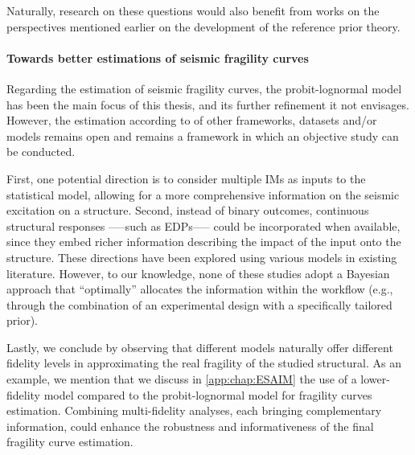 Naturally, research on these questions would also benefit from works on the perspectives mentioned earlier
on the development of the reference prior theory.



\paragraph{Towards better estimations of seismic fragility curves}


Regarding the estimation of seismic fragility curves, the probit-lognormal model has been the main focus of this thesis,
and its further refinement it not envisages.
However, the estimation according to
of other frameworks, datasets and/or models remains open and remains a framework in which an objective study can be conducted.

First, one potential direction is to consider multiple IMs as inputs to the statistical model, allowing for a more comprehensive information on the seismic excitation on a structure. Second, instead of binary outcomes, continuous structural responses --—such as EDPs—-- could be incorporated when available, since they embed richer information describing the impact of the input onto the structure. These directions have been explored using various models in existing literature. However, to our knowledge, none of these studies adopt a Bayesian approach that ``optimally'' allocates the information within the workflow (e.g., through the combination of an experimental design with a specifically tailored prior).

Lastly, we conclude by observing that different models naturally offer different fidelity levels in approximating the real fragility of the studied structural. As an example, we mention that we discuss in \cref{app:chap:ESAIM} the use of 
a lower-fidelity model compared to the probit-lognormal model for fragility curves estimation. Combining multi-fidelity analyses, each bringing complementary information, could enhance the robustness and informativeness of the final fragility curve estimation.








